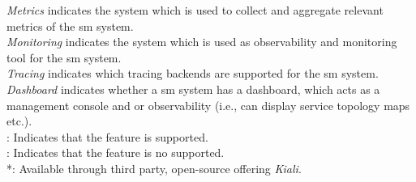 \begin{table*}[t]
{\textit{Metrics} indicates the system which is used to collect and aggregate relevant metrics of the \gls{sm} system. \\
\textit{Monitoring} indicates the system which is used as observability and monitoring tool for the \gls{sm} system. \\
\textit{Tracing} indicates which tracing backends are supported for the \gls{sm} system. \\
\textit{Dashboard} indicates whether a \gls{sm} system has a dashboard, which acts as a management console and or observability (i.e., can display service topology maps etc.). \\

\cmark: Indicates that the feature is supported. \\
\xmark: Indicates that the feature is no supported. \\
*: Available through third party, open-source offering \textit{Kiali}.
}
\label{tab:result-observability}
\end{table*}

